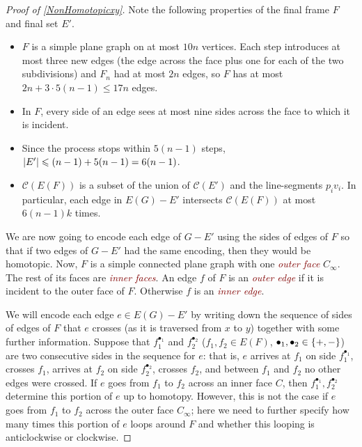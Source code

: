 \documentclass[a4paper,11pt]{article}
\renewcommand{\leq}{\leqslant}
\DeclarePairedDelimiter{\abs}{\lvert}{\rvert} %
\DeclarePairedDelimiter{\set}{\lbrace}{\rbrace} %
\newcommand{\defn}[1]{\textcolor{Maroon}{\emph{#1}}}
\newcommand{\CC}{\mathcal{C}}
\begin{document}
\begin{proof}[Proof of \cref{NonHomotopicxy}]
Note the following properties of the final frame $F$ and final set $E'$.
\begin{itemize}
    \item $F$ is a simple plane graph on at most $10n$ vertices. Each step introduces at most three new edges (the edge across the face plus one for each of the two subdivisions) and $F_n$ had at most $2n$ edges, so $F$ has at most $2n + 3 \cdot 5(n - 1) \leqslant 17 n$ edges.
    \item In $F$, every side of an edge sees at most nine sides across the face to which it is incident.
    \item Since the process stops within $5(n - 1)$ steps, $\abs{E'} \leq (n - 1) + 5(n - 1) = 6(n - 1)$.
    \item $\CC(E(F))$ is a subset of the union of $\CC(E')$ and the line-segments $p_i v_i$. In particular, each edge in $E(G) - E'$ intersects $\CC(E(F))$ at most $6(n - 1)k$ times.
\end{itemize}
We are now going to encode each edge of $G - E'$ using the sides of edges of $F$ so that if two edges of $G - E'$ had the same encoding, then they would be homotopic. Now, $F$ is a simple connected plane graph with one \defn{outer face} $C_{\infty}$. The rest of its faces are \defn{inner faces}. An edge $f$ of $F$ is an \defn{outer edge} if it is incident to the outer face of $F$. Otherwise $f$ is an \defn{inner edge}.

We will encode each edge $e \in E(G) - E'$ by writing down the sequence of sides of edges of $F$ that $e$ crosses (as it is traversed from $x$ to $y$) together with some further information. Suppose that $f_1^{\bullet_1}$ and $f_2^{\bullet_2}$ ($f_1, f_2 \in E(F)$, $\bullet_1, \bullet_2 \in \set{+, -}$) are two consecutive sides in the sequence for $e$: that is, $e$ arrives at $f_1$ on side $f_1^{\bullet_1}$, crosses $f_1$, arrives at $f_2$ on side $f_2^{\bullet_2}$, crosses $f_2$, and between $f_1$ and $f_2$ no other edges were crossed. If $e$ goes from $f_1$ to $f_2$ across an inner face $C$, then $f_1^{\bullet_1}, f_2^{\bullet_2}$ determine this portion of $e$ up to homotopy. However, this is not the case if $e$ goes from $f_1$ to $f_2$ across the outer face $C_{\infty}$; here we need to further specify how many times this portion of $e$ loops around $F$ and whether this looping is anticlockwise or clockwise.


\end{proof}
\end{document}
